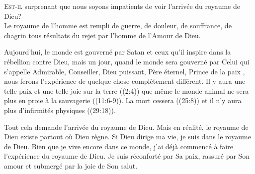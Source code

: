 \dvrule







\lettrine{E}{st-il} surprenant que nous soyons impatients
 de voir l'arrivée du royaume de Dieu? \\[1ex]
Le royaume de l'homme est rempli de guerre, de douleur, de souffrance,
 de chagrin \ocadr tous résultats du rejet par l'homme de l'Amour de Dieu. 


Aujourd'hui, le monde est gouverné par Satan et ceux qu'il inspire
 dans la rébellion contre Dieu, mais un jour, quand le monde sera gouverné
 par Celui qui s'appelle \Og Admirable, Conseiller, Dieu puissant,
 Père éternel, Prince de la paix \Fg{}, 
 nous ferons l'expérience de quelque chose complètement différent.
 Il y aura une telle paix et une telle joie sur la terre ((2:4))
 que même le monde animal ne sera plus en proie à la sauvagerie
 ((11:6-9)).
 La mort cessera ((25:8))
 et il n'y aura plus d'infirmités physiques ((29:18)). 

Tout cela demande l'arrivée du royaume de Dieu.
 Mais en réalité, le royaume de Dieu existe partout où Dieu règne.
 Si Dieu dirige ma vie, je suis dans le royaume de Dieu.
 Bien que je vive encore dans ce monde, j'ai déjà commencé à faire
 l'expérience du royaume de Dieu. Je suis réconforté par Sa paix,
 rassuré par Son amour et submergé par la joie de Son salut. 

